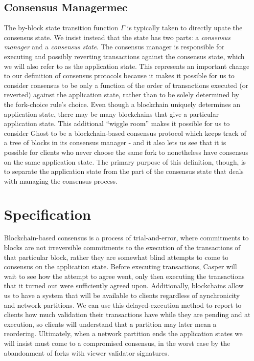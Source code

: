 \documentclass[11pt,a4paper]{article}
\begin{document}
\subsection{Consensus Managermec}

The by-block state transition function $\Gamma$ is typically taken to directly upate the consensus state. We insist instead that the state has two parts: a \emph{consensus manager} and a \emph{consensus state}. The consensus manager is responsible for executing and possibly reverting transactions against the consensus state, which we will also refer to as the application state. This represents an important change to our definition of consensus protocols because it makes it possible for us to consider consensus to be only a function of the order of transactions executed (or reverted) against the application state, rather than to be solely determined by the fork-choice rule's choice. Even though a blockchain uniquely determines an application state, there may be many blockchains that give a particular application state. This additional ``wiggle room'' makes it possible for us to consider Ghost to be a blockchain-based consensus protocol which keeps track of a tree of blocks in its consensus manager - and it also lets us see that it is possible for clients who never choose the same fork to nonetheless have consensus on the same application state. The primary purpose of this definition, though, is to separate the application state from the part of the consensus state that deals with managing the consensus process.

\section{Specification}

Blockchain-based consensus is a process of trial-and-error, where commitments to blocks are not irreversible commitments to the execution of the transactions of that particular block, rather they are somewhat blind attempts to come to consensus on the application state. Before executing transactions, Casper will wait to see how the attempt to agree went, only then executing the transactions that it turned out were sufficiently agreed upon. Additionally, blockchains allow us to have a system that will be available to clients regardless of aynchronicity and network partitions. We can use this delayed-execution method to report to clients how much validation their transactions have while they are pending and at execution, so clients will understand that a partition may later mean a reordering. Ultimately, when a network partition ends the application states we will insist must come to a compromised consensus, in the worst case by the abandonment of forks with viewer validator signatures. 
\end{document}
